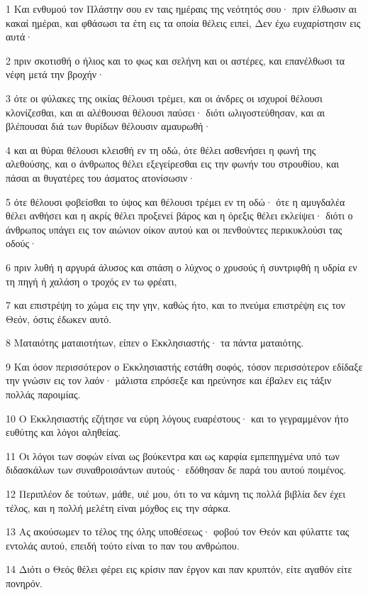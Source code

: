 \par 1 Και ενθυμού τον Πλάστην σου εν ταις ημέραις της νεότητός σου· πριν έλθωσιν αι κακαί ημέραι, και φθάσωσι τα έτη εις τα οποία θέλεις ειπεί, Δεν έχω ευχαρίστησιν εις αυτά·
\par 2 πριν σκοτισθή ο ήλιος και το φως και σελήνη και οι αστέρες, και επανέλθωσι τα νέφη μετά την βροχήν·
\par 3 ότε οι φύλακες της οικίας θέλουσι τρέμει, και οι άνδρες οι ισχυροί θέλουσι κλονίζεσθαι, και αι αλέθουσαι θέλουσι παύσει· διότι ωλιγοστεύθησαν, και αι βλέπουσαι διά των θυρίδων θέλουσιν αμαυρωθή·
\par 4 και αι θύραι θέλουσι κλεισθή εν τη οδώ, ότε θέλει ασθενήσει η φωνή της αλεθούσης, και ο άνθρωπος θέλει εξεγείρεσθαι εις την φωνήν του στρουθίου, και πάσαι αι θυγατέρες του άσματος ατονίσωσιν·
\par 5 ότε θέλουσι φοβείσθαι το ύψος και θέλουσι τρέμει εν τη οδώ· ότε η αμυγδαλέα θέλει ανθήσει και η ακρίς θέλει προξενεί βάρος και η όρεξις θέλει εκλείψει· διότι ο άνθρωπος υπάγει εις τον αιώνιον οίκον αυτού και οι πενθούντες περικυκλούσι τας οδούς·
\par 6 πριν λυθή η αργυρά άλυσος και σπάση ο λύχνος ο χρυσούς ή συντριφθή η υδρία εν τη πηγή ή χαλάση ο τροχός εν τω φρέατι,
\par 7 και επιστρέψη το χώμα εις την γην, καθώς ήτο, και το πνεύμα επιστρέψη εις τον Θεόν, όστις έδωκεν αυτό.
\par 8 Ματαιότης ματαιοτήτων, είπεν ο Εκκλησιαστής· τα πάντα ματαιότης.
\par 9 Και όσον περισσότερον ο Εκκλησιαστής εστάθη σοφός, τόσον περισσότερον εδίδαξε την γνώσιν εις τον λαόν· μάλιστα επρόσεξε και ηρεύνησε και έβαλεν εις τάξιν πολλάς παροιμίας.
\par 10 Ο Εκκλησιαστής εζήτησε να εύρη λόγους ευαρέστους· και το γεγραμμένον ήτο ευθύτης και λόγοι αληθείας.
\par 11 Οι λόγοι των σοφών είναι ως βούκεντρα και ως καρφία εμπεπηγμένα υπό των διδασκάλων των συναθροισάντων αυτούς· εδόθησαν δε παρά του αυτού ποιμένος.
\par 12 Περιπλέον δε τούτων, μάθε, υιέ μου, ότι το να κάμνη τις πολλά βιβλία δεν έχει τέλος, και η πολλή μελέτη είναι μόχθος εις την σάρκα.
\par 13 Ας ακούσωμεν το τέλος της όλης υποθέσεως· φοβού τον Θεόν και φύλαττε τας εντολάς αυτού, επειδή τούτο είναι το παν του ανθρώπου.
\par 14 Διότι ο Θεός θέλει φέρει εις κρίσιν παν έργον και παν κρυπτόν, είτε αγαθόν είτε πονηρόν.


